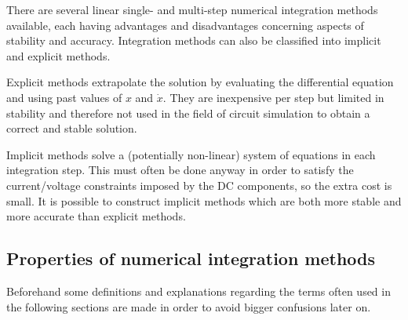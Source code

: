 There are several linear single- and multi-step numerical integration
methods available, each having advantages and disadvantages concerning
aspects of stability and accuracy.  Integration methods can also be
classified into implicit and explicit methods.

Explicit methods extrapolate the solution by evaluating the
differential equation and using past values of $x$ and $\dot{x}$.
They are inexpensive per step but limited in stability and therefore
not used in the field of circuit simulation to obtain a correct and
stable solution.

Implicit methods solve a (potentially non-linear) system of equations
in each integration step.  This must often be done anyway in order to
satisfy the current/voltage constraints imposed by the DC components,
so the extra cost is small.  It is possible to construct implicit
methods which are both more stable and more accurate than explicit
methods.

\subsection{Properties of numerical integration methods}

Beforehand some definitions and explanations regarding the terms often
used in the following sections are made in order to avoid bigger
confusions later on.

